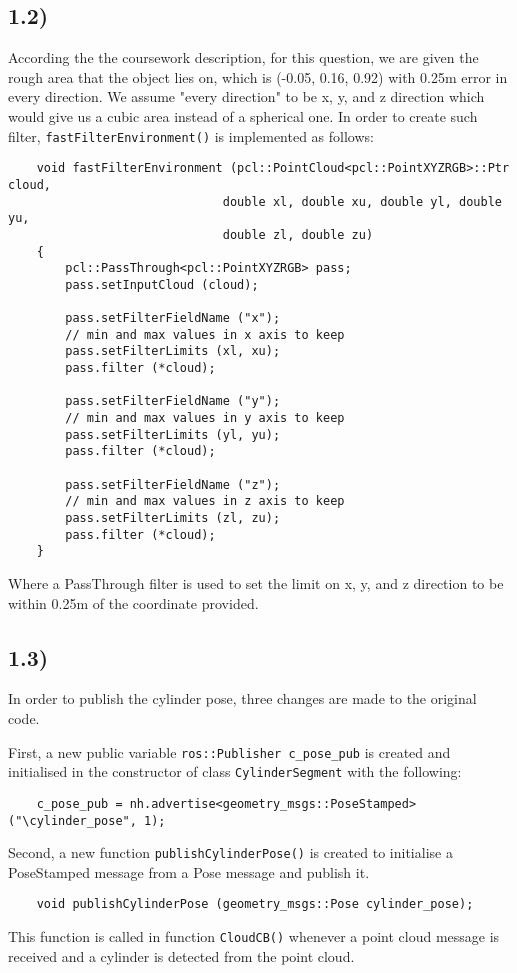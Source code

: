 \documentclass{homework}
\begin{document}
\subsection*{1.2)}
According the the coursework description, for this question, we are given the rough area that the object lies on, which is (-0.05, 0.16, 0.92) with 0.25m error in every direction. We assume "every direction" to be x, y, and z direction which would give us a cubic area instead of a spherical one. In order to create such filter, \texttt{fastFilterEnvironment()} is implemented as follows:
\begin{verbatim}
    void fastFilterEnvironment (pcl::PointCloud<pcl::PointXYZRGB>::Ptr cloud, 
                              double xl, double xu, double yl, double yu, 
                              double zl, double zu)
    {
        pcl::PassThrough<pcl::PointXYZRGB> pass;
        pass.setInputCloud (cloud);
        
        pass.setFilterFieldName ("x");
        // min and max values in x axis to keep
        pass.setFilterLimits (xl, xu);
        pass.filter (*cloud);
        
        pass.setFilterFieldName ("y");
        // min and max values in y axis to keep
        pass.setFilterLimits (yl, yu);
        pass.filter (*cloud);
        
        pass.setFilterFieldName ("z");
        // min and max values in z axis to keep
        pass.setFilterLimits (zl, zu);
        pass.filter (*cloud);
    }
\end{verbatim}
Where a PassThrough filter is used to set the limit on x, y, and z direction to be within 0.25m of the coordinate provided.


\subsection*{1.3)} \label{Sec:1.3}
In order to publish the cylinder pose, three changes are made to the original code. 

First, a new public variable \texttt{ros::Publisher c_pose_pub} is created and initialised in the constructor of class \texttt{CylinderSegment} with the following:
\begin{verbatim}
    c_pose_pub = nh.advertise<geometry_msgs::PoseStamped>("\cylinder_pose", 1);
\end{verbatim}

Second, a new function \texttt{publishCylinderPose()} is created to initialise a PoseStamped message from a Pose message and publish it. 
\begin{verbatim}
    void publishCylinderPose (geometry_msgs::Pose cylinder_pose);
\end{verbatim}
This function is called in function \texttt{CloudCB()} whenever a point cloud message is received and a cylinder is detected from the point cloud.
\end{document}
